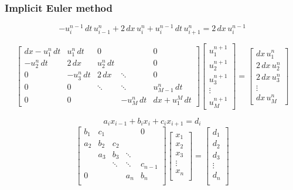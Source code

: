 \begin{frame}
  \frametitle{Implicit Euler method}
  $$-u_{i}^{n-1} \, dt \, u_{i-1}^{n} +  2 \, dx \,  u_{i}^{n} + u_{i}^{n-1} \, dt \, u_{i+1}^{n}=  2 \, dx \, u_{i}^{n-1}$$

  $$  \left[{\begin{matrix}
    {dx- u_{1}^{n}\, dt}&{ u_{1}^{n} \, dt}&{0}&{}&{0}\\[5pt]
    {-u_{2}^{n} \, dt}&{ 2 \, dx}&{ u_{2}^{n} \, dt}&{}&{0}\\[5pt]
    {0}&{-u_{3}^{n} \, dt}&{ 2 \, dx}&\ddots &{0}\\[5pt]
    {0}&{0}&\ddots &\ddots &{ u_{M-1}^{n} \, dt}\\[5pt]
    {0}&{0}&{}&{-u_{M}^{n} \, dt}&{dx + u_{1}^{M}\, dt}
    \end{matrix}}
    \right]\left[{
    \begin{matrix}
    { u_{1}^{n+1}}\\[5pt]
    { u_{2}^{n+1}}\\[5pt]
    { u_{3}^{n+1}}\\[5pt]
    \vdots \\[5pt]
    { u_{M}^{n+1}}
    \end{matrix}}
    \right]
    =\left[{
    \begin{matrix}
    {dx \, u_{1}^{n}}\\[5pt]
    { 2 \, dx \, u_{2}^{n}}\\[5pt]
    { 2 \, dx \, u_{3}^{n}}\\[5pt]
    \vdots \\[5pt]
    {dx \, u_{M}^{n}}
    \end{matrix}}
    \right]$$
\end{frame}


\begin{frame}
  $$a_{i}x_{{i-1}}+b_{i}x_{i}+c_{i}x_{{i+1}}=d_{i}$$
  $$\begin{bmatrix}{b_{1}}&{c_{1}}&{}&{}&{0}\\
      {a_{2}}&{b_{2}}&{c_{2}}&{}&{}\\
      {}&{a_{3}}&{b_{3}}&\ddots &{}\\
      {}&{}&\ddots &\ddots &{c_{n-1}}\\
      {0}&{}&{}&{a_{n}}&{b_{n}}\\
      \end{bmatrix}
      \begin{bmatrix}{x_{1}}\\
      {x_{2}}\\{x_{3}}\\\vdots \\
      {x_{n}}\\
      \end{bmatrix}
      =
      \begin{bmatrix}{d_{1}}\\
      {d_{2}}\\{d_{3}}\\
      \vdots \\{d_{n}}\\
    \end{bmatrix} $$
\end{frame}

